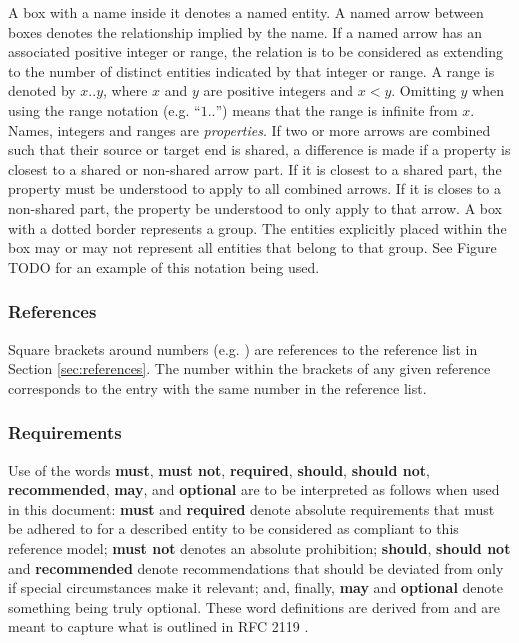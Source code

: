 A box with a name inside it denotes a named entity.
A named arrow between boxes denotes the relationship implied by the name.
If a named arrow has an associated positive integer or range, the relation is to be considered as extending to the number of distinct entities indicated by that integer or range.
A range is denoted by $x..y$, where $x$ and $y$ are positive integers and $x<y$.
Omitting $y$ when using the range notation (e.g. ``$1..$'') means that the range is infinite from $x$.
Names, integers and ranges are \textit{properties}.
If two or more arrows are combined such that their source or target end is shared, a difference is made if a property is closest to a shared or non-shared arrow part.
If it is closest to a shared part, the property must be understood to apply to all combined arrows.
If it is closes to a non-shared part, the property be understood to only apply to that arrow.
A box with a dotted border represents a group.
The entities explicitly placed within the box may or may not represent all entities that belong to that group.
See Figure TODO for an example of this notation being used.

\subsubsection{References}

Square brackets around numbers (e.g. \cite{palm2021reference}) are references to the reference list in Section \ref{sec:references}.
The number within the brackets of any given reference corresponds to the entry with the same number in the reference list.

\subsubsection{Requirements}

Use of the words \textbf{must}, \textbf{must not}, \textbf{required}, \textbf{should}, \textbf{should not}, \textbf{recommended}, \textbf{may}, and \textbf{optional} are to be interpreted as follows when used in this document: \textbf{must} and \textbf{required} denote absolute requirements that must be adhered to for a described entity to be considered as compliant to this reference model; \textbf{must not} denotes an absolute prohibition; \textbf{should}, \textbf{should not} and \textbf{recommended} denote recommendations that should be deviated from only if special circumstances make it relevant; and, finally, \textbf{may} and \textbf{optional} denote something being truly optional.
These word definitions are derived from and are meant to capture what is outlined in RFC 2119 \cite{bradner1997keywords}.

